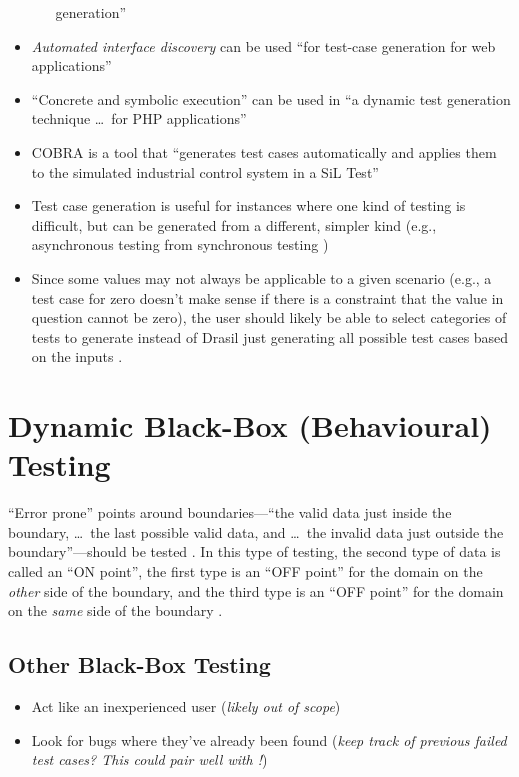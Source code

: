 \begin{itemize}
\begin{itemize}
                    generation'' \citep[p.~345]{LahiriEtAl2013}
          \end{itemize}
    \item \emph{Automated interface discovery} can be used ``for test-case
          generation for web applications'' \citep[p.~184]{DoğanEtAl2014}
    \item ``Concrete and symbolic execution'' can be used in ``a dynamic test
          generation technique \dots\ for PHP applications''
          \citep[p.~192]{DoğanEtAl2014} 
    \item COBRA is a tool that ``generates test cases automatically and
          applies them to the simulated industrial control system in a SiL
          Test'' \citep[p.~2]{PreußeEtAl2012}
    \item Test case generation is useful for instances where one kind of
          testing is difficult, but can be generated from a different,
          simpler kind (e.g., asynchronous testing from synchronous testing
          \citep{JardEtAl1999})
    \item Since some values may not always be applicable to a given scenario
          (e.g., a test case for zero doesn't make sense if there is a
          constraint that the value in question cannot be zero), the user
          should likely be able to select categories of tests to generate
          instead of Drasil just generating all possible test cases based on
          the inputs \citep{june_11_meeting}.
\end{itemize}

\section[Dynamic Black-Box (Behavioural) Testing]{Dynamic Black-Box
  (Behavioural) Testing \citep[pp.~64-65]{Patton2006}}

``Error prone'' points around boundaries---``the valid data just inside the
boundary, \dots\ the last possible valid data, and \dots\ the invalid data
just outside the boundary''\citep[p.~73]{Patton2006}---should be tested
\citep[p.~430]{vanVliet2000}. In this type of testing, the second type of
data is called an ``ON point'', the first type is an ``OFF point'' for the
domain on the \emph{other} side of the boundary, and the third type is an ``OFF
point'' for the domain on the \emph{same} side of the boundary
\citep[p.~430]{vanVliet2000}.

\subsection[Other Black-Box Testing]{Other Black-Box Testing
    \citep[pp.~87-89]{Patton2006}}
\begin{itemize}
    \item Act like an inexperienced user (\emph{likely out of scope})
    \item Look for bugs where they've already been found (\emph{keep track of
              previous failed test cases? This could pair well with
              !})
\end{itemize}

